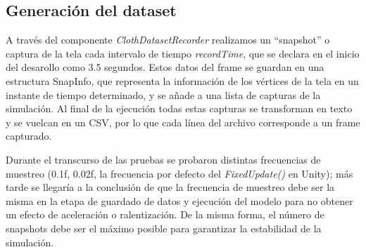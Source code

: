 \subsection{Generación del dataset}
A través del componente \textit{ClothDatasetRecorder} realizamos un ``snapshot'' o captura de la tela cada intervalo de tiempo \textit{recordTime}, que se declara en el inicio del desarollo como 3.5 segundos. Estos datos del frame se guardan en una estructura SnapInfo, que representa la información de los vértices de la tela en un instante de tiempo determinado, y se añade a una lista de capturas de la simulación. 
Al final de la ejecución todas estas capturas se transforman en texto y se vuelcan en un CSV, por lo que cada línea del archivo corresponde a un frame capturado. \newline


\begin{algorithm}[H]
\caption{Struct SnapInfo}

\end{algorithm}

Durante el transcurso de las pruebas se probaron distintas frecuencias de muestreo (0.1f, 0.02f, la frecuencia por defecto del \textit{FixedUpdate()} en Unity); más tarde se llegaría a la conclusión de que la frecuencia de muestreo debe ser la misma en la etapa de guardado de datos y ejecución del modelo para no obtener un efecto de aceleración o ralentización. De la misma forma, el número de snapshots debe ser el máximo posible para garantizar la estabilidad de la simulación.